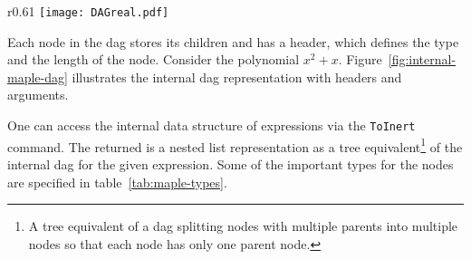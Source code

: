 
\begin{wrapfigure}{r}{0.61\textwidth}
	\vspace{-22pt}
	\centering
	\texttt{[image: DAGreal.pdf]}
	\vspace{-5pt}
	\caption{The internal \Maple{} DAG representation of $x^2+x$.}
	\label{fig:internal-maple-dag}
	\vspace{-15pt}
\end{wrapfigure}

Each node in the \gls*{dag} stores its children and has a header, which defines the type and the length of the node. Consider the polynomial $x^2+x$. Figure~\ref{fig:internal-maple-dag} illustrates the internal \gls*{dag} representation with headers and arguments.

One can access the internal data structure of expressions via the \texttt{ToInert} command. The returned \inertF{} is a nested list representation as a tree equivalent\footnote{A tree equivalent of a \gls*{dag} splitting nodes with multiple parents into multiple nodes so that each node has only one parent node.} of the internal \gls*{dag} for the given expression. Some of the important types for the nodes are specified in table~\ref{tab:maple-types}.


